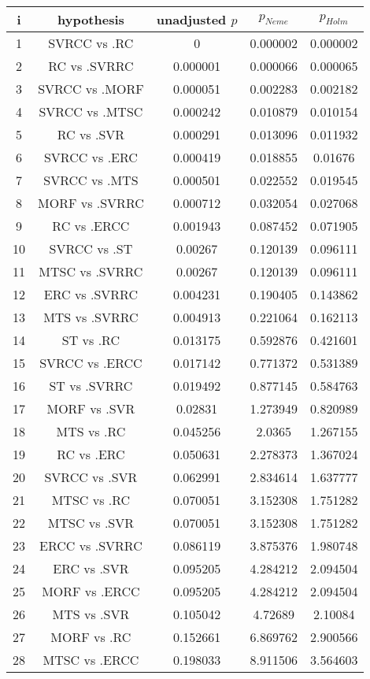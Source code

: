 \documentclass[a4paper,10pt]{article}
\begin{document}
\begin{landscape}
\begin{table}[!htp]
\centering\scriptsize
\begin{tabular}{ccccc}
i&hypothesis&unadjusted $p$&$p_{Neme}$&$p_{Holm}$\\
\hline1&SVRCC vs .RC&0&0.000002&0.000002\\
2&RC vs .SVRRC&0.000001&0.000066&0.000065\\
3&SVRCC vs .MORF&0.000051&0.002283&0.002182\\
4&SVRCC vs .MTSC&0.000242&0.010879&0.010154\\
5&RC vs .SVR&0.000291&0.013096&0.011932\\
6&SVRCC vs .ERC&0.000419&0.018855&0.01676\\
7&SVRCC vs .MTS&0.000501&0.022552&0.019545\\
8&MORF vs .SVRRC&0.000712&0.032054&0.027068\\
9&RC vs .ERCC&0.001943&0.087452&0.071905\\
10&SVRCC vs .ST&0.00267&0.120139&0.096111\\
11&MTSC vs .SVRRC&0.00267&0.120139&0.096111\\
12&ERC vs .SVRRC&0.004231&0.190405&0.143862\\
13&MTS vs .SVRRC&0.004913&0.221064&0.162113\\
14&ST vs .RC&0.013175&0.592876&0.421601\\
15&SVRCC vs .ERCC&0.017142&0.771372&0.531389\\
16&ST vs .SVRRC&0.019492&0.877145&0.584763\\
17&MORF vs .SVR&0.02831&1.273949&0.820989\\
18&MTS vs .RC&0.045256&2.0365&1.267155\\
19&RC vs .ERC&0.050631&2.278373&1.367024\\
20&SVRCC vs .SVR&0.062991&2.834614&1.637777\\
21&MTSC vs .RC&0.070051&3.152308&1.751282\\
22&MTSC vs .SVR&0.070051&3.152308&1.751282\\
23&ERCC vs .SVRRC&0.086119&3.875376&1.980748\\
24&ERC vs .SVR&0.095205&4.284212&2.094504\\
25&MORF vs .ERCC&0.095205&4.284212&2.094504\\
26&MTS vs .SVR&0.105042&4.72689&2.10084\\
27&MORF vs .RC&0.152661&6.869762&2.900566\\
28&MTSC vs .ERCC&0.198033&8.911506&3.564603\\

\end{tabular}
\end{table}
\end{landscape}
\end{document}
